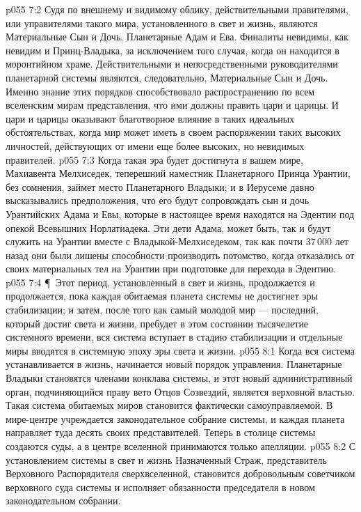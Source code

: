 \vs p055 7:2 Судя по внешнему и видимому облику, действительными правителями, или управителями такого мира, установленного в свет и жизнь, являются Материальные Сын и Дочь, Планетарные Адам и Ева. Финалиты невидимы, как невидим и Принц\hyp{}Владыка, за исключением того случая, когда он находится в моронтийном храме. Действительными и непосредственными руководителями планетарной системы являются, следовательно, Материальные Сын и Дочь. Именно знание этих порядков способствовало распространению по всем вселенским мирам представления, что ими должны править цари и царицы. И цари и царицы оказывают благотворное влияние в таких идеальных обстоятельствах, когда мир может иметь в своем распоряжении таких высоких личностей, действующих от имени еще более высоких, но невидимых правителей.
\vs p055 7:3 Когда такая эра будет достигнута в вашем мире, Махиавента Мелхиседек, теперешний наместник Планетарного Принца Урантии, без сомнения, займет место Планетарного Владыки; и в Иерусеме давно высказывались предположения, что его будут сопровождать сын и дочь Урантийских Адама и Евы, которые в настоящее время находятся на Эдентии под опекой Всевышних Норлатиадека. Эти дети Адама, может быть, так и будут служить на Урантии вместе с Владыкой\hyp{}Мелхиседеком, так как почти 37\,000 лет назад они были лишены способности производить потомство, когда отказались от своих материальных тел на Урантии при подготовке для перехода в Эдентию.
\vs p055 7:4 \P\ Этот период, установленный в свет и жизнь, продолжается и продолжается, пока каждая обитаемая планета системы не достигнет эры стабилизации; и затем, после того как самый молодой мир --- последний, который достиг света и жизни, пребудет в этом состоянии тысячелетие системного времени, вся система вступает в стадию стабилизации и отдельные миры вводятся в системную эпоху эры света и жизни.
\vs p055 8:1 Когда вся система устанавливается в жизнь, начинается новый порядок управления. Планетарные Владыки становятся членами конклава системы, и этот новый административный орган, подчиняющийся праву вето Отцов Созвездий, является верховной властью. Такая система обитаемых миров становится фактически самоуправляемой. В мире\hyp{}центре учреждается законодательное собрание системы, и каждая планета направляет туда десять своих представителей. Теперь в столице системы создаются суды, а в центре вселенной принимаются только апелляции.
\vs p055 8:2 С установлением системы в свет и жизнь Назначенный Страж, представитель Верховного Распорядителя сверхвселенной, становится добровольным советчиком верховного суда системы и исполняет обязанности председателя в новом законодательном собрании.
